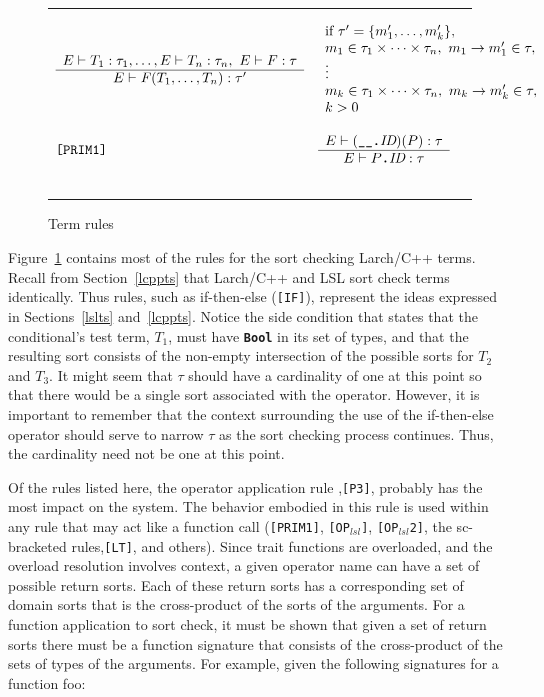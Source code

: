\documentclass[12pt]{article} %
\newcommand{\reserved}[1]{\textbf{\texttt{#1}}} %
\newcommand{\RULELAB}[1]{\texttt{#1}}
\newcommand{\UNSPACEFORBOX}{\vspace{-2ex}}
\newcommand{\HLINE}{\UNSPACEFORBOX%
\begin{flushleft}\rule{\textwidth}{0.01in}\end{flushleft}%
\UNSPACEFORBOX}
\newenvironment{BFIGURE}{

\begin{figure}
\small
\HLINE
}{
\HLINE
\normalsize
\end{figure}
}
\begin{document}
\begin{BFIGURE}
\begin{displaymath}
\begin{array}{lll}
\begin{array}{c}
E \vdash T_1:\tau_1,\dots,E \vdash T_n:\tau_n,~ E \vdash F:\tau \\
\hline
E \vdash \mbox{\textit{F}}(T_1,\dots,T_n):\tau'
\end{array}
&
\begin{array}{l}
\mbox{if } \tau' = \{m_1',\dots,m_k'\},\\
m_1 \in \tau_1 \times \dots \times \tau_n,~m_1 \rightarrow m_1' \in
\tau,\\
\vdots\\
m_k \in \tau_1 \times \dots \times \tau_n,~m_k \rightarrow m_k' \in
\tau,\\
k > 0
\end{array}
\\
~\\
\RULELAB{[PRIM1]} &
\begin{array}{c}
E \vdash (\mbox{\reserved{\_\_.}}\mbox{\it ID})(P):\tau \\
\hline
E \vdash P\mbox{\reserved{.}}\mbox{\it ID}:\tau
\end{array}
\\
~\\
\end{array}
\end{displaymath}
\caption{Term rules}
\label{fig-term}
\end{BFIGURE}

Figure~\ref{fig-term} contains most of the rules for the sort checking
Larch/C++ terms. Recall from Section~\ref{lcppts} that
Larch/C++ and LSL sort check terms identically. Thus rules, such as
if-then-else (\RULELAB{[IF]}), represent the ideas expressed in
Sections~\ref{lslts} and~\ref{lcppts}. Notice the side condition that
states that the conditional's test term, $T_1$, must have \reserved{Bool} in its
set of types, and that the resulting sort consists of the non-empty
intersection of the possible sorts for $T_2$ and $T_3$. It might seem
that $\tau$ should have a cardinality of one at this point so that
there would be a single sort associated with the operator. However, it
is important to remember that the context surrounding the use of the
if-then-else operator should serve to narrow $\tau$ as the sort
checking process continues. Thus, the cardinality need not be one at
this point.

Of the rules listed here, the operator application rule
,\RULELAB{[P3]}, probably has the most impact on the system. The
behavior embodied in this rule is used within any rule that may act
like a function call (\RULELAB{[PRIM1]}, \RULELAB{[OP$_{lsl}$]},
\RULELAB{[OP$_{lsl}$2]}, the sc-bracketed rules,\RULELAB{[LT]}, and
others). Since trait functions are overloaded, and the overload
resolution involves context, a given operator name can have a set of
possible return sorts. Each of these return sorts has a corresponding set
of domain sorts that is the cross-product of the sorts of the
arguments. For a function application to sort check, it must be shown
that given a set of return sorts there must be a function signature
that consists of the cross-product of the sets of types of the
arguments. For example, given the following signatures for a function
foo:
\end{document}
